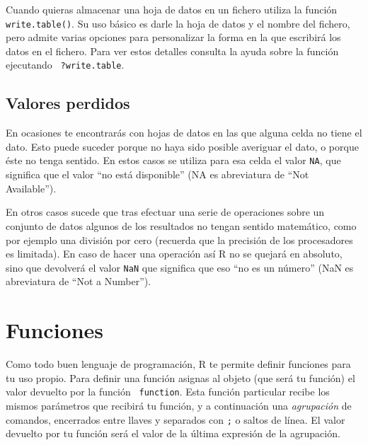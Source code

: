
Cuando quieras  almacenar una hoja de  datos en un fichero  utiliza la
función {\tt write.table()}. Su uso básico es darle la hoja de datos y
el nombre del  fichero, pero admite varias  opciones para personalizar
la  forma en  la  que escribirá  los  datos en  el  fichero. Para  ver
estos  detalles consulta  la ayuda  sobre la  función ejecutando  {\tt
?write.table}. 

\subsection{Valores perdidos}


En ocasiones  te encontrarás  con hojas de datos  en las  que alguna
celda no tiene el dato. Esto puede suceder porque no haya sido posible
averiguar el dato,  o porque éste no tenga sentido.  En estos casos se
utiliza para esa  celda el valor {\tt NA}, que  significa que el valor
``no está disponible'' (NA es abreviatura de ``Not Available'').


En otros casos sucede que tras efectuar una serie de operaciones sobre
un  conjunto de  datos algunos  de  los resultados  no tengan  sentido
matemático, como  por ejemplo una  división por cero (recuerda  que la
precisión  de los  procesadores es  limitada).  En caso  de hacer  una
operación así {\sf R} no se quejará en absoluto, sino que devolverá el
valor {\tt  NaN} que  significa que  eso ``no es  un número''  (NaN es
abreviatura de ``Not a Number'').


\section{Funciones}


Como todo  buen lenguaje de  programación, {\sf R} te  permite definir
funciones  para tu  uso propio.  Para definir  una función  asignas al
objeto (que  será tu función)  el valor  devuelto por la  función {\tt
function}. Esta  función particular  recibe los mismos  parámetros que
recibirá  tu  función,  y  a  continuación  una  {\em  agrupación}  de
comandos, encerrados entre llaves y separados  con {\tt ;} o saltos de
línea. El  valor devuelto por  tu función será  el valor de  la última
expresión de la agrupación.

